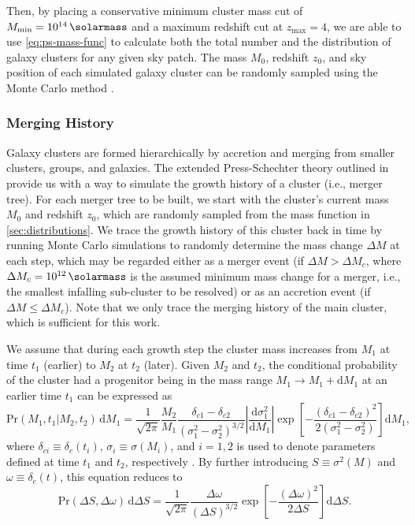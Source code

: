 \documentclass[modern]{aastex61}
\newcommand{\R}[1]{\mathrm{#1}}
\newcommand{\D}[1]{\R{d} #1}
\newcommand{\diff}[2]{\frac{\D{#1}}{\D{#2}}}
\begin{document}
Then, by placing a conservative minimum cluster mass cut of
$M_{\R{min}} = \SI{e14}{\solarmass}$ and a maximum redshift cut
at $z_{\R{max}} = 4$, we are able to use \autoref{eq:ps-mass-func}
to calculate both the total number and the distribution of galaxy
clusters for any given sky patch.
The mass $M_0$, redshift $z_0$, and sky position of each simulated
galaxy cluster can be randomly sampled using the Monte Carlo method
\citep{wang2010}.


\subsubsection{Merging History}
\label{sec:merging-history}

Galaxy clusters are formed hierarchically by accretion and merging from
smaller clusters, groups, and galaxies.
The extended Press-Schechter theory outlined in \citet{lacey1993} provide
us with a way to simulate the growth history of a cluster (i.e., merger tree).
For each merger tree to be built, we start with the cluster's current
mass $M_0$ and redshift $z_0$, which are randomly sampled from the
mass function in \autoref{sec:distributions}.
We trace the growth history of this cluster back in time by running
Monte Carlo simulations to randomly determine the mass change
$\Delta M$ at each step, which may be regarded either as a merger event
(if $\Delta M > \Delta M_c$, where $\Delta M_c = \SI{e12}{\solarmass}$
is the assumed minimum mass change for a merger, i.e., the smallest infalling
sub-cluster to be resolved) or as an accretion event
(if $\Delta M \leq \Delta M_c$).
Note that we only trace the merging history of the main cluster, which is
sufficient for this work.

We assume that during each growth step the cluster mass increases from
$M_1$ at time $t_1$ (earlier) to $M_2$ at $t_2$ (later).
Given $M_2$ and $t_2$, the conditional probability of the cluster had
a progenitor being in the mass range $M_1 \to M_1 + \D{M_1}$ at an
earlier time $t_1$ can be expressed as
\begin{equation}
  \label{eq:eps-condprob}
  \R{Pr}(M_1, t_1 | M_2, t_2) \,\D{M_1} = \frac{1}{\sqrt{2\pi}}
\frac{M_2}{M_1}
  \frac{\delta_{c1} - \delta_{c2}}{(\sigma_1^2 - \sigma_2^2)^{3/2}}
  \left| \diff{\sigma_1^2}{M_1} \right|
  \exp \!\left[ -\frac{(\delta_{c1} - \delta_{c2})^2}
    {2(\sigma_1^2 - \sigma_2^2)} \right] \D{M_1},
\end{equation}
where
$\delta_{ci} \equiv \delta_c(t_i)$, $\sigma_i \equiv \sigma(M_i)$, and $i =
1, 2$ is used to denote parameters defined at time $t_1$ and $t_2$,
respectively \citep{lacey1993,randall2002}.
By further introducing $S \equiv \sigma^2(M)$ and
$\omega \equiv \delta_c(t)$, this equation reduces to
\begin{equation}
  \label{eq:eps-condprob-simp}
  \R{Pr}(\Delta S, \Delta \omega) \,\D{\Delta S} = \frac{1}{\sqrt{2\pi}}
  \frac{\Delta\omega}{(\Delta S)^{3/2}}
  \exp \!\left[ -\frac{(\Delta\omega)^2}{2 \Delta S} \right] \D{\Delta S}.
\end{equation}
\end{document}

